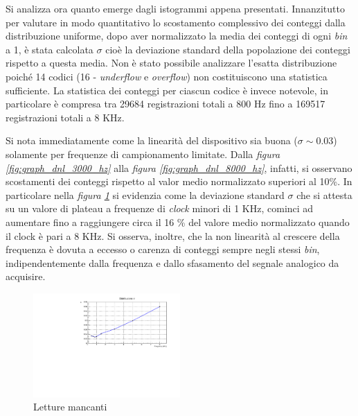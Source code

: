 \documentclass[journal]{IEEEtran}
\begin{document}
Si analizza ora quanto emerge dagli istogrammi appena presentati. Innanzitutto per valutare in modo quantitativo lo scostamento complessivo dei conteggi dalla distribuzione uniforme, dopo aver normalizzato la media dei conteggi di ogni \textit{bin} a 1, è stata calcolata $\sigma$ cioè la deviazione standard della popolazione dei conteggi rispetto a questa media. Non è stato possibile analizzare l'esatta distribuzione poiché 14 codici (16 - \textit{underflow} e \textit{overflow}) non costituiscono una statistica sufficiente. La statistica dei conteggi per ciascun codice è invece notevole, in particolare è compresa tra 29684 registrazioni totali a 800 Hz fino a 169517 registrazioni totali a 8 KHz.

Si nota immediatamente come la linearità del dispositivo sia buona ($\sigma \sim 0.03$) solamente per frequenze di campionamento limitate. Dalla \textit{figura \ref{fig:graph_dnl_3000_hz}} alla \textit{figura \ref{fig:graph_dnl_8000_hz}}, infatti, si osservano scostamenti dei conteggi rispetto al valor medio normalizzato superiori al 10\%.
In particolare nella \textit{figura \ref{fig:graph_dnl_sigma}} si evidenzia come la deviazione standard $\sigma$ che si attesta su un valore di plateau a frequenze di \textit{clock} minori di 1 KHz, cominci ad aumentare fino a raggiungere circa il 16 \% del valore medio normalizzato quando il clock è pari a 8 KHz. Si osserva, inoltre, che la non linearità al crescere della frequenza è dovuta a eccesso o carenza di conteggi sempre negli stessi \textit{bin}, indipendentemente dalla frequenza e dallo sfasamento del segnale analogico da acquisire.

\begin{figure}[H]%
\begin{center}
\includegraphics[width=0.50\textwidth]{analysis/output/dnl_sigma_pdf}
\caption{Letture mancanti}
\label{fig:graph_dnl_sigma}
\end{center}
\end{figure}
\end{document}
